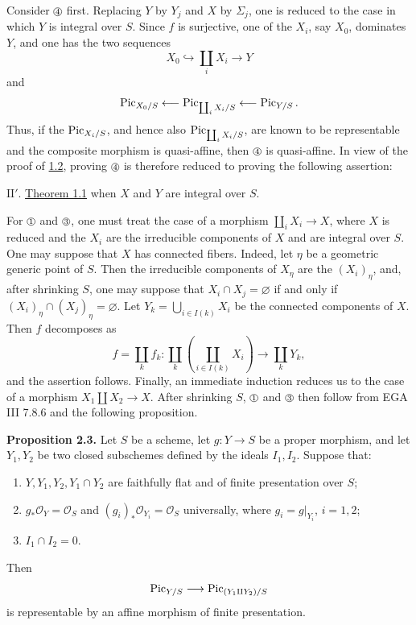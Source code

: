 Consider $\sgacircled{4}$ first. Replacing $Y$ by $Y_j$ and $X$ by
$\Sigma_j$, one is reduced to the case in which $Y$ is integral over $S$.
Since $f$ is surjective, one of the $X_i$, say $X_0$, dominates $Y$, and one
has the two sequences
\[
  X_0\hookrightarrow\coprod_iX_i\longrightarrow Y
\]
and
\[
  \operatorname{Pic}_{X_0/S}\longleftarrow\operatorname{Pic}_{\coprod_iX_i/S}
  \longleftarrow\operatorname{Pic}_{Y/S}.
\]
Thus, if the $\operatorname{Pic}_{X_i/S}$, and hence also
$\operatorname{Pic}_{\coprod_iX_i/S}$, are known to be representable and the composite
morphism is quasi-affine, then $\sgacircled{4}$ is quasi-affine. In view of
the proof of \hyperlink{sga6.e12.cor.1-2}{1.2}, proving $\sgacircled{4}$ is therefore reduced to proving
the following assertion:

\medskip
\noindent
$\mathrm{II}'$. \hyperlink{sga6.e12.thm.1-1}{Theorem 1.1} when $X$ and $Y$ are integral over $S$.
\medskip

For $\sgacircled{1}$ and $\sgacircled{3}$, one must treat the case of a
morphism $\coprod_iX_i\to X$, where $X$ is reduced and the $X_i$ are the
  irreducible components of $X$ and are integral over $S$. One may suppose that
  $X$ has connected fibers. Indeed, let $\eta$ be a geometric generic point of
  $S$.
Then the irreducible components of $X_\eta$ are the $(X_i)_\eta$, and, after
shrinking $S$, one may suppose that $X_i\cap X_j=\varnothing$ if and only if
$(X_i)_\eta\cap(X_j)_\eta=\varnothing$. Let
$Y_k=\bigcup_{i\in I(k)}X_i$ be the connected components of $X$. Then $f$
decomposes as
\[
  f=\coprod_k f_k:
  \coprod_k\left(\coprod_{i\in I(k)}X_i\right)
  \longrightarrow\coprod_kY_k,
\]
and the assertion follows. Finally, an immediate induction reduces us to the
case of a morphism $X_1\amalg X_2\to X$. After shrinking $S$,
$\sgacircled{1}$ and $\sgacircled{3}$ then follow from EGA III 7.8.6 and the
following proposition.

\textbf{Proposition 2.3.} Let $S$ be a scheme, let $g:Y\to S$ be a proper
morphism, and let $Y_1,Y_2$ be two closed subschemes defined by the ideals
$I_1,I_2$. Suppose that:
\begin{enumerate}[label=\alph*)]
\item $Y,Y_1,Y_2,Y_1\cap Y_2$ are faithfully flat and of finite presentation
  over $S$;
\item $g_*\mathcal O_Y=\mathcal O_S$ and
  $(g_i)_*\mathcal O_{Y_i}=\mathcal O_S$ universally, where
  $g_i=g|_{Y_i}$, $i=1,2$;
\item $I_1\cap I_2=0$.
\end{enumerate}
Then
\[
  \operatorname{Pic}_{Y/S}\longrightarrow\operatorname{Pic}_{(Y_1\amalg Y_2)/S}
\]
is representable by an affine morphism of finite presentation.

